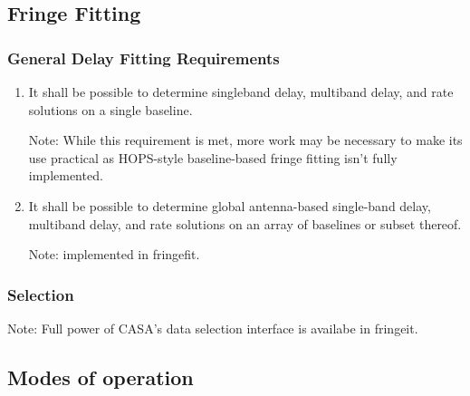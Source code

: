 \documentclass[11pt,a4paper]{article}
\begin{document}
\subsection{Fringe Fitting}

\subsubsection{General Delay Fitting Requirements}

\begin{enumerate}[subsubseclist]

\item It shall be possible to determine singleband delay, multiband
  delay, and rate solutions on a single baseline.

  Note: While this requirement is met, more work may be necessary to
  make its use practical as HOPS-style baseline-based fringe fitting
  isn't fully implemented.

\item It shall be possible to determine global antenna-based
  single-band delay, multiband delay, and rate solutions on an array
  of baselines or subset thereof.

  Note: implemented in fringefit.

\end{enumerate}

\subsubsection{Selection}

Note: Full power of CASA's data selection interface is availabe in fringeit.

\subsection{Modes of operation}
\end{document}
